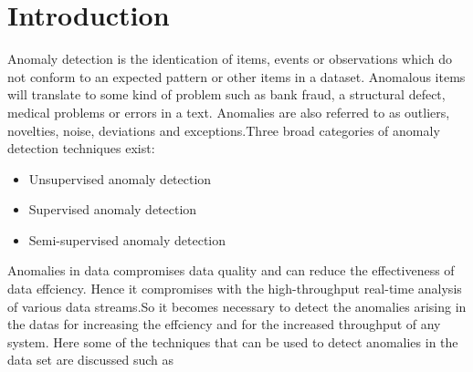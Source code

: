 \documentclass[10pt,a4paper,journal]{IEEEtran}
\begin{document}
\section{Introduction}
Anomaly detection is the identication of items, events or
observations which do not conform to an expected pattern or other
items in a dataset. Anomalous items will translate to some kind of problem such as bank fraud, a structural defect, medical problems or errors in a text. Anomalies are also referred to as outliers, novelties, noise, deviations and exceptions.Three broad categories of anomaly detection techniques exist:
\begin{itemize}
    \item Unsupervised anomaly detection 
    \item Supervised anomaly detection
    \item Semi-supervised anomaly detection
\end{itemize}
Anomalies in data compromises data quality and can reduce the effectiveness of data effciency. Hence it compromises with the high-throughput real-time analysis of various data streams.So it becomes necessary to detect the anomalies arising in the datas for increasing the effciency and for the increased throughput of any system. Here some of the techniques that can be used to detect anomalies in the data set are discussed such as
\end{document}
